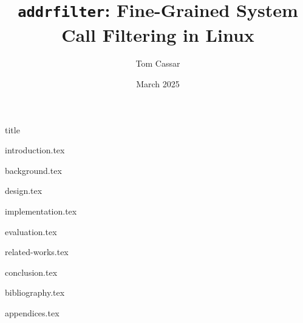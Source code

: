 \documentclass[fontsize=14pt]{article}
\title{\texttt{addrfilter}: Fine-Grained System Call Filtering in Linux}
\author{Tom Cassar}
\date{March 2025}
\begin{document}
{title}

\clearpage

{introduction.tex}

\clearpage

{background.tex}

\clearpage

{design.tex}

\clearpage

{implementation.tex}

\clearpage

{evaluation.tex}

\clearpage

{related-works.tex}

\clearpage

{conclusion.tex}

\clearpage

{bibliography.tex}

\clearpage

{appendices.tex}
\end{document}
